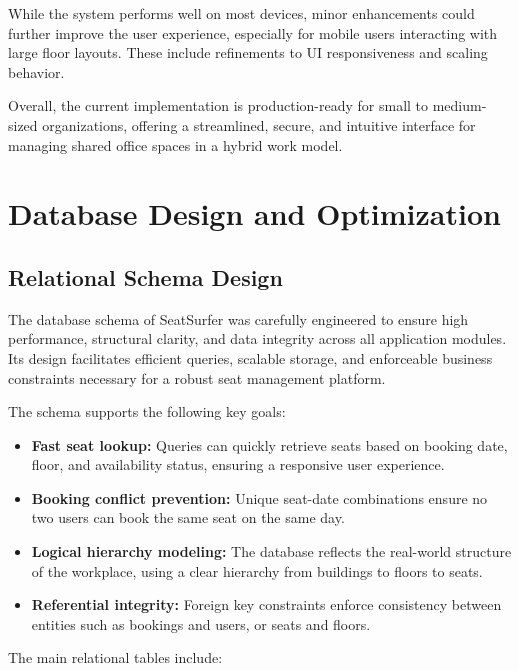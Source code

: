 \documentclass[12pt,a4paper]{report} %
\begin{document}
While the system performs well on most devices, minor enhancements could further improve the user experience, especially for mobile users interacting with large floor layouts. These include refinements to UI responsiveness and scaling behavior.

Overall, the current implementation is production-ready for small to medium-sized organizations, offering a streamlined, secure, and intuitive interface for managing shared office spaces in a hybrid work model.

\newpage

\chapter{Database Design and Optimization}

\section{Relational Schema Design}

The database schema of SeatSurfer was carefully engineered to ensure high performance, structural clarity, and data integrity across all application modules. Its design facilitates efficient queries, scalable storage, and enforceable business constraints necessary for a robust seat management platform.

The schema supports the following key goals:
\begin{itemize}
    \item \textbf{Fast seat lookup:} Queries can quickly retrieve seats based on booking date, floor, and availability status, ensuring a responsive user experience.
    \item \textbf{Booking conflict prevention:} Unique seat-date combinations ensure no two users can book the same seat on the same day.
    \item \textbf{Logical hierarchy modeling:} The database reflects the real-world structure of the workplace, using a clear hierarchy from buildings to floors to seats.
    \item \textbf{Referential integrity:} Foreign key constraints enforce consistency between entities such as bookings and users, or seats and floors.
\end{itemize}

The main relational tables include:
\end{document}
